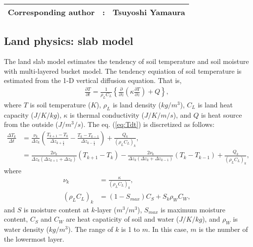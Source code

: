 {\bf \Large 
\begin{tabular}{ccc}
\hline
  Corresponding author & : & Tsuyoshi Yamaura\\
\hline
\end{tabular}
}


\subsection{Land physics: slab model}

The land slab model estimates the tendency of soil temperature and soil moisture with multi-layered bucket model.
The tendency equiation of soil temperature is estimated from the 1-D vertical diffusion equation.
That is,
\begin{align}
  \frac{\partial T}{\partial t} = \frac{1}{\rho_{L}C_{L}} \left\{ \frac{\partial}{\partial z} \left( \kappa \frac{\partial T}{\partial z} \right) + Q \right\},
  \label{eq:Tdt}
\end{align}
where $T$ is soil temperature ($K$), $\rho_{L}$ is land density ($kg/m^3$), $C_{L}$ is land heat capacity ($J/K/kg$), $\kappa$ is thermal conductivity ($J/K/m/s$), and $Q$ is heat source from the outside ($J/m^3/s$).
The eq. (\ref{eq:Tdt}) is discretized as follows:
\begin{align}
  \frac{\Delta T_{k}}{\Delta t} &= \frac{\nu_{k}}{\Delta z_{k}} \left( \frac{T_{k+1}-T_{k}}{\Delta z_{k+\frac{1}{2}}} - \frac{T_{k}-T_{k-1}}{\Delta z_{k-\frac{1}{2}}} \right) + \frac{Q_{k}}{(\rho_{L}C_{L})_{k}}, \\
                                &= \frac{ 2\nu_{k} }{ \Delta z_{k} (\Delta z_{k+1}+\Delta z_{k}) }(T_{k+1}-T_{k}) - \frac{ 2\nu_{k} }{ \Delta z_{k} (\Delta z_{k}+\Delta z_{k-1}) }(T_{k}-T_{k-1}) +\frac{Q_{k}}{(\rho_{L}C_{L})_{k}},
\end{align}
where
\begin{align}
  \nu_{k} &= \frac{\kappa}{(\rho_{L}C_{L})_{k}}, \\
  (\rho_{L}C_{L})_{k} &= ( 1 - S_{max} ) C_{S} + S_{k} \rho_{W}C_{W},
\end{align}
and $S$ is moisture content at $k$-layer ($m^3/m^3$), $S_{max}$ is maximum moisture content, $C_{S}$ and $C_{W}$ are heat capaticity of soil and water ($J/K/kg$), and $\rho_{W}$ is water density ($kg/m^3$).
The range of $k$ is 1 to $m$.
In this case, $m$ is the number of the lowermost layer.
